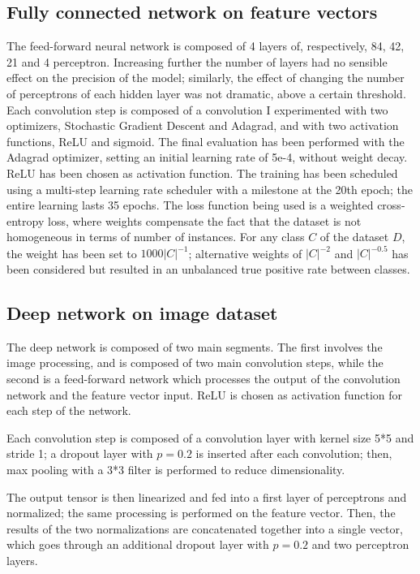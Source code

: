 \documentclass[10pt,a4paper,twocolumn]{article}
\begin{document}
\subsection{Fully connected network on feature vectors}

The feed-forward neural network is composed of 4 layers of, respectively, 84, 42, 21 and 4 perceptron.
Increasing further the number of layers had no sensible effect on the precision of the model; similarly, the effect of changing the number of perceptrons of each hidden layer was not dramatic, above a certain threshold.
Each convolution step is composed of a convolution
I experimented with two optimizers, Stochastic Gradient Descent and Adagrad, and with two activation functions, ReLU and sigmoid. The final evaluation has been performed with the Adagrad optimizer, setting an initial learning rate of 5e-4, without weight decay. ReLU has been chosen as activation function. The training has been scheduled using a multi-step learning rate scheduler with a milestone at the 20th epoch; the entire learning lasts 35 epochs. The loss function being used is a weighted cross-entropy loss, where weights compensate the fact that the dataset is not homogeneous in terms of number of instances. For any class $C$ of the dataset $D$, the weight has been set to $1000{|C|}^{-1}$; alternative weights of ${|C|}^{-2}$ and $|C|^{-0.5}$ has been considered but resulted in an unbalanced true positive rate between classes.

\subsection{Deep network on image dataset}

The deep network is composed of two main segments. The first involves the image processing, and is composed of two main convolution steps, while the second is a feed-forward network which processes the output of the convolution network and the feature vector input. ReLU is chosen as activation function for each step of the network.

Each convolution step is composed of a convolution layer with kernel size 5*5 and stride 1; a dropout layer with $p = 0.2$ is inserted after each convolution; then, max pooling with a 3*3 filter is performed to reduce dimensionality.

The output tensor is then linearized and fed into a first layer of perceptrons and normalized; the same processing is performed on the feature vector. Then, the results of the two normalizations are concatenated together into a single vector, which goes through an additional dropout layer with $p = 0.2$ and two perceptron layers.  
\end{document}
